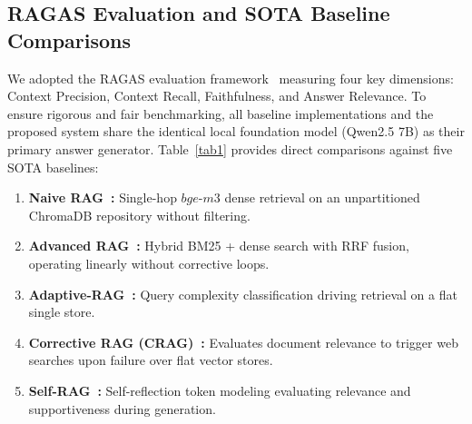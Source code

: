 \documentclass[conference]{IEEEtran}
\begin{document}
\subsection{RAGAS Evaluation and SOTA Baseline Comparisons}
We adopted the RAGAS evaluation framework~\cite{es2023ragas} measuring four key dimensions: Context Precision, Context Recall, Faithfulness, and Answer Relevance. To ensure rigorous and fair benchmarking, all baseline implementations and the proposed system share the identical local foundation model (Qwen2.5 7B) as their primary answer generator. Table~\ref{tab1} provides direct comparisons against five SOTA baselines:
\begin{enumerate}
    \item \textbf{Naive RAG~\cite{lewis2020retrieval}:} Single-hop $bge\text{-}m3$ dense retrieval on an unpartitioned ChromaDB repository without filtering.
    \item \textbf{Advanced RAG~\cite{gao2023modular}:} Hybrid BM25 + dense search with RRF fusion, operating linearly without corrective loops.
    \item \textbf{Adaptive-RAG~\cite{jeong2024adaptive}:} Query complexity classification driving retrieval on a flat single store.
    \item \textbf{Corrective RAG (CRAG)~\cite{yan2024corrective}:} Evaluates document relevance to trigger web searches upon failure over flat vector stores.
    \item \textbf{Self-RAG~\cite{asai2023self}:} Self-reflection token modeling evaluating relevance and supportiveness during generation.
\end{enumerate}
\end{document}
